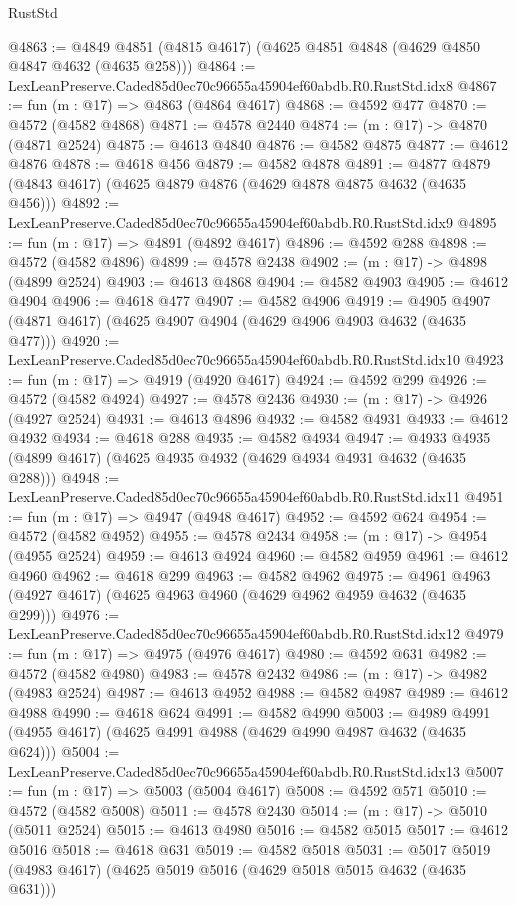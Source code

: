 \begin{lexlean}{RustStd}
\begin{coremodule}
@4863 := @4849 @4851 (@4815 @4617) (@4625 @4851 @4848 (@4629 @4850 @4847 @4632 (@4635 @258)))
@4864 := LexLeanPreserve.Caded85d0ec70c96655a45904ef60abdb.R0.RustStd.idx8
@4867 := fun (m : @17) => @4863 (@4864 @4617)
@4868 := @4592 @477
@4870 := @4572 (@4582 @4868)
@4871 := @4578 @2440
@4874 := (m : @17) -> @4870 (@4871 @2524)
@4875 := @4613 @4840
@4876 := @4582 @4875
@4877 := @4612 @4876
@4878 := @4618 @456
@4879 := @4582 @4878
@4891 := @4877 @4879 (@4843 @4617) (@4625 @4879 @4876 (@4629 @4878 @4875 @4632 (@4635 @456)))
@4892 := LexLeanPreserve.Caded85d0ec70c96655a45904ef60abdb.R0.RustStd.idx9
@4895 := fun (m : @17) => @4891 (@4892 @4617)
@4896 := @4592 @288
@4898 := @4572 (@4582 @4896)
@4899 := @4578 @2438
@4902 := (m : @17) -> @4898 (@4899 @2524)
@4903 := @4613 @4868
@4904 := @4582 @4903
@4905 := @4612 @4904
@4906 := @4618 @477
@4907 := @4582 @4906
@4919 := @4905 @4907 (@4871 @4617) (@4625 @4907 @4904 (@4629 @4906 @4903 @4632 (@4635 @477)))
@4920 := LexLeanPreserve.Caded85d0ec70c96655a45904ef60abdb.R0.RustStd.idx10
@4923 := fun (m : @17) => @4919 (@4920 @4617)
@4924 := @4592 @299
@4926 := @4572 (@4582 @4924)
@4927 := @4578 @2436
@4930 := (m : @17) -> @4926 (@4927 @2524)
@4931 := @4613 @4896
@4932 := @4582 @4931
@4933 := @4612 @4932
@4934 := @4618 @288
@4935 := @4582 @4934
@4947 := @4933 @4935 (@4899 @4617) (@4625 @4935 @4932 (@4629 @4934 @4931 @4632 (@4635 @288)))
@4948 := LexLeanPreserve.Caded85d0ec70c96655a45904ef60abdb.R0.RustStd.idx11
@4951 := fun (m : @17) => @4947 (@4948 @4617)
@4952 := @4592 @624
@4954 := @4572 (@4582 @4952)
@4955 := @4578 @2434
@4958 := (m : @17) -> @4954 (@4955 @2524)
@4959 := @4613 @4924
@4960 := @4582 @4959
@4961 := @4612 @4960
@4962 := @4618 @299
@4963 := @4582 @4962
@4975 := @4961 @4963 (@4927 @4617) (@4625 @4963 @4960 (@4629 @4962 @4959 @4632 (@4635 @299)))
@4976 := LexLeanPreserve.Caded85d0ec70c96655a45904ef60abdb.R0.RustStd.idx12
@4979 := fun (m : @17) => @4975 (@4976 @4617)
@4980 := @4592 @631
@4982 := @4572 (@4582 @4980)
@4983 := @4578 @2432
@4986 := (m : @17) -> @4982 (@4983 @2524)
@4987 := @4613 @4952
@4988 := @4582 @4987
@4989 := @4612 @4988
@4990 := @4618 @624
@4991 := @4582 @4990
@5003 := @4989 @4991 (@4955 @4617) (@4625 @4991 @4988 (@4629 @4990 @4987 @4632 (@4635 @624)))
@5004 := LexLeanPreserve.Caded85d0ec70c96655a45904ef60abdb.R0.RustStd.idx13
@5007 := fun (m : @17) => @5003 (@5004 @4617)
@5008 := @4592 @571
@5010 := @4572 (@4582 @5008)
@5011 := @4578 @2430
@5014 := (m : @17) -> @5010 (@5011 @2524)
@5015 := @4613 @4980
@5016 := @4582 @5015
@5017 := @4612 @5016
@5018 := @4618 @631
@5019 := @4582 @5018
@5031 := @5017 @5019 (@4983 @4617) (@4625 @5019 @5016 (@4629 @5018 @5015 @4632 (@4635 @631)))

\end{coremodule}
\end{lexlean}
